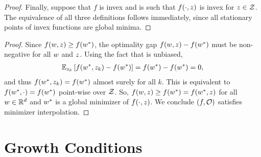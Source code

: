 \begin{proof}
    Finally, suppose that \( f \) is invex and \oracle{} is such that \( f(\cdot, \z) \) is invex for \( \z \in \calZ \).
    The equivalence of all three definitions follows immediately, since all stationary points of invex functions are global minima.
\end{proof}

\boundedBelow*
\begin{proof}
    Since \( f(\w, \z ) \geq f(\wopt) \), the optimality gap \( f(\w, \z) - f(\wopt) \) must be non-negative for all \( \w \) and \( \z \).
    Using the fact that \oracle{} is unbiased, 
    \begin{align*}
        \Ek \sbr{f(\wopt, \zk) - f(\wopt)} = f(\wopt) - f(\wopt) = 0,
    \end{align*}
    and thus \( f(\wopt, \zk) = f(\wopt) \) almost surely for all \( k \).
    This is equivalent to \( f(\wopt, \cdot) = f(\wopt) \) point-wise over \( \calZ \). 
    So, \( f(\w, \z) \geq f(\wopt) = f(\wopt, \z) \) for all \( \w \in \R^d \) and \( \wopt \) is a global minimizer of \( f(\cdot, \z) \).
    We conclude \( \rbr{f, \oracle{}} \) satisfies minimizer interpolation.
\end{proof}

\section{Growth Conditions}~\label{app:growth-conditions}

